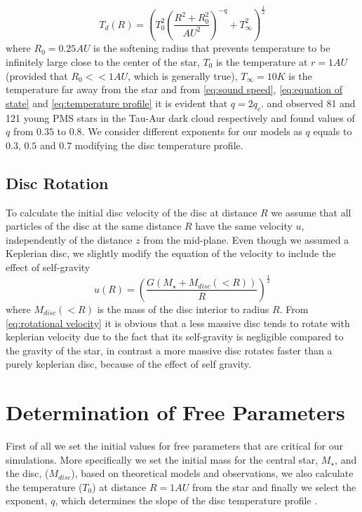 \documentclass[aps,prb,twocolumn,superscriptaddress,floatfix,longbibliography]{revtex4-2}
\newcounter{para}
\begin{document}
\begin{equation}\label{eq:temperature profile}
    T_{d}(R) = \left(T_0^{2}(\frac{R^2 + R_0^{2}}{AU^2})^{-q} + T_{\infty}^2\right)^{\frac{1}{2}}
\end{equation}
where $R_0 = 0.25 AU$ is the softening radius that prevents temperature to be infinitely large close to the center of the star, $T_0$ is the temperature at $r=1AU$ (provided that $R_0 << 1AU$, which is generally true), $T_{\infty} = 10 K$ is the temperature far away from the star and from \eqref{eq:sound speed}, \eqref{eq:equation of state} and \eqref{eq:temperature profile} it is evident that $q=2q_c$. \cite{beckwith1990survey} and \cite{osterloh1995millimeter} observed 81 and 121 young PMS stars in the Tau-Aur dark cloud respectively and found values of $q$ from $0.35$ to $0.8$.  We consider different exponents for our models as $q$ equals to $0.3$, $0.5$ and $ 0.7$ modifying the disc temperature profile.

\subsection{Disc Rotation}
To calculate the initial disc velocity of the disc at distance $R$ we assume that all particles of the disc at the same distance $R$ have the same velocity $u$, independently of the distance $z$ from the mid-plane. Even though we assumed a Keplerian disc, we slightly modify the equation of the velocity to include the effect of self-gravity
\begin{equation}\label{eq:rotational velocity}
    u(R) = \left(\frac{G(M_{\star} + M_{disc}(<R))}{R}\right)^\frac{1}{2}
\end{equation}
where $M_{disc}(<R)$ is the mass of the disc interior to radius $R$. From \eqref{eq:rotational velocity} it is obvious that a less massive disc tends to rotate with keplerian velocity due to the fact that its self-gravity is negligible compared to the gravity of the star, in contrast a more massive disc rotates faster than a purely keplerian disc, because of the effect of self gravity.

\section{Determination of Free Parameters}
First of all we set the initial values for free parameters that are critical for our simulations. More specifically we set the initial mass for the central star, $M_{\star}$, and the disc, ($M_{disc}$), based on theoretical models and observations, we also calculate the temperature ($T_0$) at distance $R=1AU$ from the star and finally we select the exponent, $q$, which determines the slope of the disc temperature profile .
\end{document}
